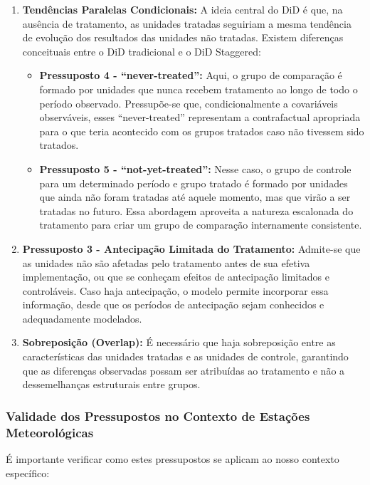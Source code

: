 \documentclass[
	12pt,				%
	oneside,			%
	a4paper,			%
	english,			%
	french,				%
	spanish,			%
	brazil				%
	]{abntex2}
\begin{document}
\begin{enumerate}
\item \textbf{Tendências Paralelas Condicionais:} A ideia central do DiD é que, na ausência de tratamento, as unidades tratadas seguiriam a mesma tendência de evolução dos resultados das unidades não tratadas. Existem diferenças conceituais entre o DiD tradicional e o DiD Staggered:
   \begin{itemize}
   \item \textbf{Pressuposto 4 - ``never-treated'':} Aqui, o grupo de comparação é formado por unidades que nunca recebem tratamento ao longo de todo o período observado. Pressupõe-se que, condicionalmente a covariáveis observáveis, esses ``never-treated'' representam a contrafactual apropriada para o que teria acontecido com os grupos tratados caso não tivessem sido tratados.
   \item \textbf{Pressuposto 5 - ``not-yet-treated'':} Nesse caso, o grupo de controle para um determinado período e grupo tratado é formado por unidades que ainda não foram tratadas até aquele momento, mas que virão a ser tratadas no futuro. Essa abordagem aproveita a natureza escalonada do tratamento para criar um grupo de comparação internamente consistente.
   \end{itemize}

\item \textbf{Pressuposto 3 - Antecipação Limitada do Tratamento:} Admite-se que as unidades não são afetadas pelo tratamento antes de sua efetiva implementação, ou que se conheçam efeitos de antecipação limitados e controláveis. Caso haja antecipação, o modelo permite incorporar essa informação, desde que os períodos de antecipação sejam conhecidos e adequadamente modelados.

\item \textbf{Sobreposição (Overlap):} É necessário que haja sobreposição entre as características das unidades tratadas e as unidades de controle, garantindo que as diferenças observadas possam ser atribuídas ao tratamento e não a dessemelhanças estruturais entre grupos.
\end{enumerate}

\subsubsection{Validade dos Pressupostos no Contexto de Estações Meteorológicas}

É importante verificar como estes pressupostos se aplicam ao nosso contexto específico:
\end{document}
